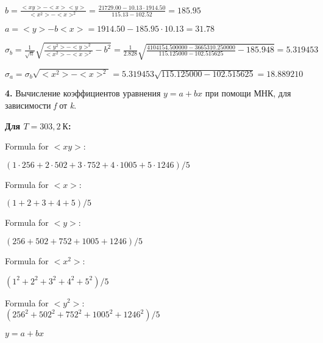\documentclass[12pt,a4paper]{article}
\begin{document}
$b = \frac{<xy> - <x><y>}{<x^2> - <x>^2} = \frac{21729.00 - 10.13 \cdot 1914.50}{115.13 - 102.52} = 185.95$
\vspace{0.5cm}

$a =<y> - b<x> = 1914.50 - 185.95 \cdot 10.13 = 31.78$
\vspace{0.5cm}

$\sigma_b = \frac{1}{\sqrt{n}} \sqrt { \frac{<y^2> - <y>^2}{<x^2> - <x>^2}  - b^2} = \frac{1}{2.828} \sqrt {\frac{4104154.500000 - 3665310.250000}{115.125000 - 102.515625} - 185.948} = 5.319453$
\vspace{0.5cm}

$\sigma_a = \sigma_b \sqrt{<x^2> - <x>^2} = 5.319453 \sqrt{115.125000 - 102.515625} = 18.889210$
\vspace{0.5cm}

\textbf{4.} Вычисление коэффициентов уравнения $y = a + bx$ при помощи МНК, для зависимости \textit{f} от \textit{k}.
\vspace{0.5cm}

\textbf{Для $T = 303,2 \: \textit{К}$:}
\vspace{0.5cm}

Formula for $<xy>:$
\vspace{0.5cm}

$(1 \cdot 256 + 2 \cdot 502 + 3 \cdot 752 + 4 \cdot 1005 + 5 \cdot 1246) / 5$
\vspace{0.5cm}

Formula for $<x>:$
\vspace{0.5cm}

$(1 + 2 + 3 + 4 + 5) / 5$
\vspace{0.5cm}

Formula for $<y>:$
\vspace{0.5cm}

$(256 + 502 + 752 + 1005 + 1246) / 5$
\vspace{0.5cm}

Formula for $<x^2>$:
\vspace{0.5cm}

$(1^2 + 2^2 + 3^2 + 4^2 + 5^2) / 5$
\vspace{0.5cm}

Formula for $<y^2>:$
\vspace{0.5cm}\\

$(256^2 + 502^2 + 752^2 + 1005^2 + 1246^2) / 5$
\vspace{0.5cm}



$y = a + bx$
\vspace{0.5cm}
\end{document}
